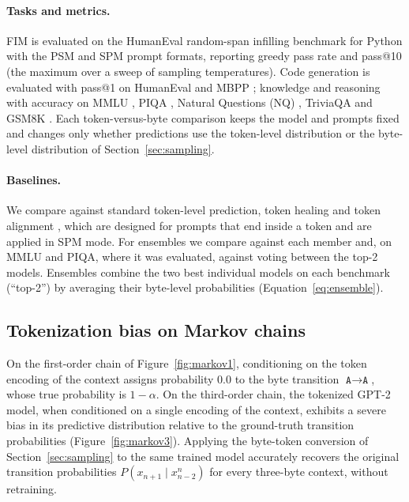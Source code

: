 \documentclass{article} %
\newcommand{\tok}[1]{\texttt{#1}}
\begin{document}
\paragraph{Tasks and metrics.} FIM is evaluated on the HumanEval random-span infilling benchmark for Python \citep{bavarian2022fim,chen2021codex} with the PSM and SPM prompt formats, reporting greedy pass rate and pass@10 (the maximum over a sweep of sampling temperatures). Code generation is evaluated with pass@1 on HumanEval \citep{chen2021codex} and MBPP \citep{austin2021mbpp}; knowledge and reasoning with accuracy on MMLU \citep{hendrycks2021mmlu}, PIQA \citep{bisk2020piqa}, Natural Questions (NQ) \citep{kwiatkowski2019nq}, TriviaQA \citep{joshi2017triviaqa} and GSM8K \citep{cobbe2021gsm8k}. Each token-versus-byte comparison keeps the model and prompts fixed and changes only whether predictions use the token-level distribution or the byte-level distribution of Section~\ref{sec:sampling}.

\paragraph{Baselines.} We compare against standard token-level prediction, token healing \citep{dagan2024tokenizer} and token alignment \citep{athiwaratkun2024alignment}, which are designed for prompts that end inside a token and are applied in SPM mode. For ensembles we compare against each member and, on MMLU and PIQA, where it was evaluated, against voting between the top-2 models. Ensembles combine the two best individual models on each benchmark (``top-2'') by averaging their byte-level probabilities (Equation~\ref{eq:ensemble}).

\subsection{Tokenization bias on Markov chains}
\label{sec:exp_markov}
On the first-order chain of Figure~\ref{fig:markov1}, conditioning on the token encoding of the context assigns probability $0.0$ to the byte transition $\tok{A}\to\tok{A}$, whose true probability is $1-\alpha$. On the third-order chain, the tokenized GPT-2 model, when conditioned on a single encoding of the context, exhibits a severe bias in its predictive distribution relative to the ground-truth transition probabilities (Figure~\ref{fig:markov3}). Applying the byte-token conversion of Section~\ref{sec:sampling} to the same trained model accurately recovers the original transition probabilities $P(x_{n+1}\mid x_{n-2}^{n})$ for every three-byte context, without retraining.
\end{document}

